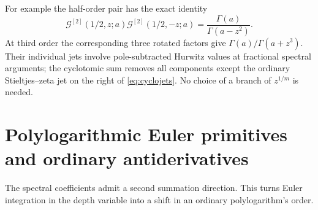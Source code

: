 \documentclass[11pt]{article}
\numberwithin{equation}{section}
\theoremstyle{definition}\newtheorem{definition}[theorem]{Definition}
\theoremstyle{remark}\newtheorem{remark}[theorem]{Remark}
\newcommand{\G}{\mathcal G}\newcommand{\F}{\mathfrak F}
\begin{document}
For example the half-order pair has the exact identity
\begin{equation}
 \G^{[2]}(1/2,z;a)\G^{[2]}(1/2,-z;a)
      =\frac{\Gamma(a)}{\Gamma(a-z^2)}.
 \label{eq:halforder}
\end{equation}
At third order the corresponding three rotated factors give
$\Gamma(a)/\Gamma(a+z^3)$. Their individual jets involve pole-subtracted
Hurwitz values at fractional spectral arguments; the cyclotomic sum removes
all components except the ordinary Stieltjes--zeta jet on the right of
\eqref{eq:cyclojets}. No choice of a branch of $z^{1/m}$ is needed.

\section{Polylogarithmic Euler primitives and ordinary antiderivatives}
\label{sec:primitives}
The spectral coefficients admit a second summation direction. This turns
Euler integration in the depth variable into a shift in an ordinary
polylogarithm's order.
\end{document}
